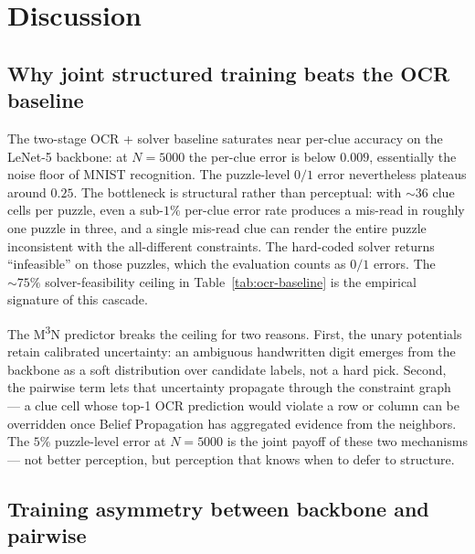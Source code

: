 \section{Discussion}
\label{sec:experiments-discussion}

\subsection{Why joint structured training beats the OCR baseline}
\label{subsec:discussion-joint-vs-ocr}

The two-stage OCR + solver baseline saturates near per-clue
accuracy on the LeNet-5 backbone: at $N = 5000$ the per-clue
error is below $0.009$, essentially the noise floor of MNIST
recognition. The puzzle-level $0/1$ error nevertheless plateaus
around $0.25$. The bottleneck is structural rather than
perceptual: with $\sim 36$ clue cells per puzzle, even a
sub-$1\%$ per-clue error rate produces a mis-read in roughly
one puzzle in three, and a single mis-read clue can render the
entire puzzle inconsistent with the all-different constraints.
The hard-coded solver returns ``infeasible'' on those puzzles,
which the evaluation counts as $0/1$ errors. The $\sim 75\%$
solver-feasibility ceiling in Table~\ref{tab:ocr-baseline} is
the empirical signature of this cascade.

The M\textsuperscript{3}N predictor breaks the ceiling for two
reasons. First, the unary potentials retain calibrated
uncertainty: an ambiguous handwritten digit emerges from the
backbone as a soft distribution over candidate labels, not a
hard pick. Second, the pairwise term lets that uncertainty
propagate through the constraint graph --- a clue cell whose
top-1 OCR prediction would violate a row or column can be
overridden once Belief Propagation has aggregated evidence from
the neighbors. The $5\%$ puzzle-level error at $N = 5000$ is
the joint payoff of these two mechanisms --- not better
perception, but perception that knows when to defer to
structure.

\subsection{Training asymmetry between backbone and pairwise}
\label{subsec:discussion-lr-pairwise}

